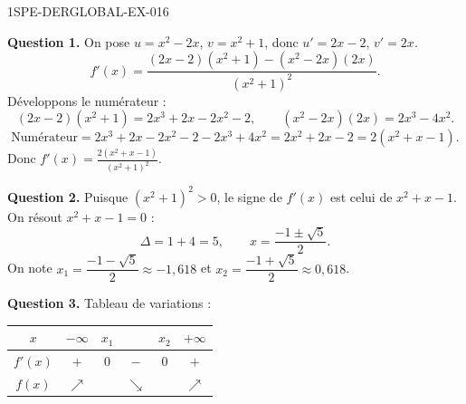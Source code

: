 \begin{corrige}{1SPE-DERGLOBAL-EX-016}

\textbf{Question 1.} On pose $u = x^2-2x$, $v = x^2+1$, donc $u' = 2x-2$, $v' = 2x$.
\[
f'(x) = \frac{(2x-2)(x^2+1) - (x^2-2x)(2x)}{(x^2+1)^2}.
\]
Développons le numérateur :
\[
(2x-2)(x^2+1) = 2x^3+2x-2x^2-2, \qquad (x^2-2x)(2x) = 2x^3-4x^2.
\]
\[
\text{Numérateur} = 2x^3+2x-2x^2-2 - 2x^3+4x^2 = 2x^2+2x-2 = 2(x^2+x-1).
\]
Donc $\displaystyle f'(x) = \frac{2(x^2+x-1)}{(x^2+1)^2}$.

\textbf{Question 2.} Puisque $(x^2+1)^2 > 0$, le signe de $f'(x)$ est celui de $x^2+x-1$. On résout $x^2+x-1=0$ :
\[
\Delta = 1 + 4 = 5, \qquad x = \frac{-1 \pm \sqrt{5}}{2}.
\]
On note $x_1 = \dfrac{-1-\sqrt{5}}{2} \approx -1{,}618$ et $x_2 = \dfrac{-1+\sqrt{5}}{2} \approx 0{,}618$.

\textbf{Question 3.} Tableau de variations :

\begin{center}
\begin{tabular}{|c|ccccc|}
\hline
$x$ & $-\infty$ & $x_1$ & & $x_2$ & $+\infty$ \\
\hline
$f'(x)$ & $+$ & $0$ & $-$ & $0$ & $+$ \\
\hline
$f(x)$ & $\nearrow$ & & $\searrow$ & & $\nearrow$ \\
\hline
\end{tabular}
\end{center}
\end{corrige}
